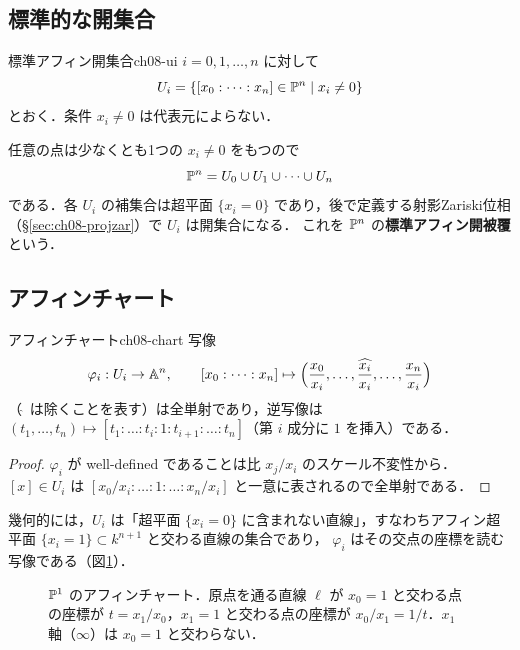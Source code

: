 \subsection{標準的な開集合}

\begin{mydef}{標準アフィン開集合}{ch08-ui}
$i=0,1,\dots,n$ に対して
\[
  U_i=\{[x_0:\dots:x_n]\in\mathbb{P}^n\mid x_i\neq0\}
\]
とおく．条件 $x_i\neq0$ は代表元によらない．
\end{mydef}

任意の点は少なくとも1つの $x_i\neq0$ をもつので
\[
  \mathbb{P}^n=U_0\cup U_1\cup\cdots\cup U_n
\]
である．各 $U_i$ の補集合は超平面 $\{x_i=0\}$ であり，後で定義する射影Zariski位相（\S\ref{sec:ch08-projzar}）で $U_i$ は開集合になる．
これを $\mathbb{P}^n$ の\textbf{標準アフィン開被覆}という．

\subsection{アフィンチャート}

\begin{myprop}{アフィンチャート}{ch08-chart}
写像
\[
  \varphi_i:U_i\to\mathbb{A}^n,\qquad [x_0:\dots:x_n]\mapsto\Bigl(\frac{x_0}{x_i},\dots,\widehat{\frac{x_i}{x_i}},\dots,\frac{x_n}{x_i}\Bigr)
\]
（$\widehat{\ }$ は除くことを表す）は全単射であり，逆写像は $(t_1,\dots,t_n)\mapsto[t_1:\dots:t_i:1:t_{i+1}:\dots:t_n]$（第 $i$ 成分に $1$ を挿入）である．
\end{myprop}

\begin{proof}
$\varphi_i$ が well-defined であることは比 $x_j/x_i$ のスケール不変性から．$[x]\in U_i$ は $[x_0/x_i:\dots:1:\dots:x_n/x_i]$ と一意に表されるので全単射である．
\end{proof}

幾何的には，$U_i$ は「超平面 $\{x_i=0\}$ に含まれない直線」，すなわちアフィン超平面 $\{x_i=1\}\subset k^{n+1}$ と交わる直線の集合であり，
$\varphi_i$ はその交点の座標を読む写像である（図\ref{fig:ch08-chart}）．

\begin{figure}[H]
\centering
{}
\caption{$\mathbb{P}^1$ のアフィンチャート．原点を通る直線 $\ell$ が $x_0=1$ と交わる点の座標が $t=x_1/x_0$，$x_1=1$ と交わる点の座標が $x_0/x_1=1/t$．$x_1$ 軸（$\infty$）は $x_0=1$ と交わらない．}
\label{fig:ch08-chart}
\end{figure}

